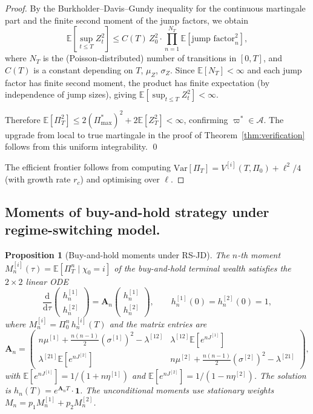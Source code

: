 \documentclass[11pt,a4paper]{article}
\numberwithin{equation}{section}
\newtheorem{proposition}[theorem]{Proposition}
\newcommand{\E}{\mathbb{E}}
\newcommand{\Var}{\mathrm{Var}}
\newcommand{\dd}{\mathrm{d}}
\begin{document}
\begin{appendices}
\begin{proof}
By the Burkholder--Davis--Gundy inequality for the continuous martingale part and the finite second moment of the jump factors, we obtain
\[
\E\!\left[\sup_{t \leq T} Z_t^2\right] \leq C(T)\, Z_0^2 \cdot \prod_{n=1}^{N_T} \E\!\left[\text{jump factor}_n^2\right],
\]
where $N_T$ is the (Poisson-distributed) number of transitions in $[0, T]$, and $C(T)$ is a constant depending on $T$, $\mu_Z$, $\sigma_Z$.  Since $\E[N_T] < \infty$ and each jump factor has finite second moment, the product has finite expectation (by independence of jump sizes), giving $\E[\sup_{t \leq T} Z_t^2] < \infty$.

Therefore $\E[\Pi_T^2] \leq 2(\Pi^{*}_{\max})^2 + 2\E[Z_T^2] < \infty$, confirming $\varpi^* \in \mathcal{A}$.  The upgrade from local to true martingale in the proof of Theorem~\ref{thm:verification} follows from this uniform integrability. \qed

The efficient frontier follows from computing $\Var[\Pi_T] = V^{[i]}(T,\Pi_0) + \ell^2/4$ (with growth rate $r_c$) and optimising over $\ell$.
\end{proof}




\subsection{Moments of buy-and-hold strategy under regime-switching model.}\label{app:bh_moments}

\begin{proposition}[Buy-and-hold moments under RS-JD]\label{prop:bh_moments}
The $n$-th moment $M_n^{[i]}(\tau) = \E[\Pi_T^n \mid \chi_0 = i]$ of the 
buy-and-hold terminal wealth satisfies the $2 \times 2$ linear ODE
\begin{equation}\label{eq:bh_moment_ode}
\frac{\dd}{\dd\tau} \begin{pmatrix} h_n^{[1]} \\ h_n^{[2]} \end{pmatrix}
= \mathbf{A}_n \begin{pmatrix} h_n^{[1]} \\ h_n^{[2]} \end{pmatrix}, 
\qquad h_n^{[1]}(0) = h_n^{[2]}(0) = 1,
\end{equation}
where $M_n^{[i]} = \Pi_0^n\, h_n^{[i]}(T)$ and the matrix entries are
\begin{equation}\label{eq:An_matrix}
\mathbf{A}_n = \begin{pmatrix}
n\mu^{[1]} + \tfrac{n(n-1)}{2}(\sigma^{[1]})^2 - \lambda^{[12]} 
  & \lambda^{[12]} \E[e^{nJ^{[1]}}] \\
\lambda^{[21]} \E[e^{nJ^{[2]}}] 
  & n\mu^{[2]} + \tfrac{n(n-1)}{2}(\sigma^{[2]})^2 - \lambda^{[21]}
\end{pmatrix},
\end{equation}
with $\E[e^{nJ^{[1]}}] = 1/(1+n\eta^{[1]})$ and 
$\E[e^{nJ^{[2]}}] = 1/(1-n\eta^{[2]})$.
The solution is $h_n(T) = e^{\mathbf{A}_n T} \cdot \mathbf{1}$.
The unconditional moments use stationary weights 
$M_n = p_1 M_n^{[1]} + p_2 M_n^{[2]}$.
\end{proposition}



\end{appendices}
\end{document}
